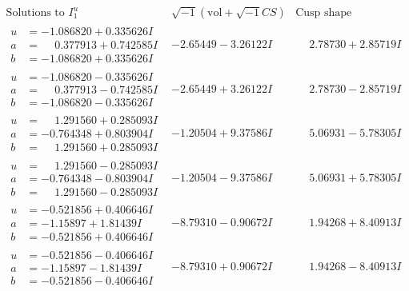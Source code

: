 \documentclass[1p]{elsarticle_modified}
\theoremstyle{definition}
\newcommand{\I}{\sqrt{-1}}
\begin{document}
$$\begin{array}{c|c|c}  
\text{Solutions to }I^u_{1}& \I (\text{vol} + \sqrt{-1}CS) & \text{Cusp shape}\\
 \hline 
\begin{aligned}
u &= -1.086820 + 0.335626 I \\
a &= \phantom{-}0.377913 + 0.742585 I \\
b &= -1.086820 + 0.335626 I\end{aligned}
 & -2.65449 - 3.26122 I & \phantom{-}2.78730 + 2.85719 I \\ \hline\begin{aligned}
u &= -1.086820 - 0.335626 I \\
a &= \phantom{-}0.377913 - 0.742585 I \\
b &= -1.086820 - 0.335626 I\end{aligned}
 & -2.65449 + 3.26122 I & \phantom{-}2.78730 - 2.85719 I \\ \hline\begin{aligned}
u &= \phantom{-}1.291560 + 0.285093 I \\
a &= -0.764348 + 0.803904 I \\
b &= \phantom{-}1.291560 + 0.285093 I\end{aligned}
 & -1.20504 + 9.37586 I & \phantom{-}5.06931 - 5.78305 I \\ \hline\begin{aligned}
u &= \phantom{-}1.291560 - 0.285093 I \\
a &= -0.764348 - 0.803904 I \\
b &= \phantom{-}1.291560 - 0.285093 I\end{aligned}
 & -1.20504 - 9.37586 I & \phantom{-}5.06931 + 5.78305 I \\ \hline\begin{aligned}
u &= -0.521856 + 0.406646 I \\
a &= -1.15897 + 1.81439 I \\
b &= -0.521856 + 0.406646 I\end{aligned}
 & -8.79310 - 0.90672 I & \phantom{-}1.94268 + 8.40913 I \\ \hline\begin{aligned}
u &= -0.521856 - 0.406646 I \\
a &= -1.15897 - 1.81439 I \\
b &= -0.521856 - 0.406646 I\end{aligned}
 & -8.79310 + 0.90672 I & \phantom{-}1.94268 - 8.40913 I \\ \hline\begin{aligned}

\end{aligned}
\end{array}$$
\end{document}
